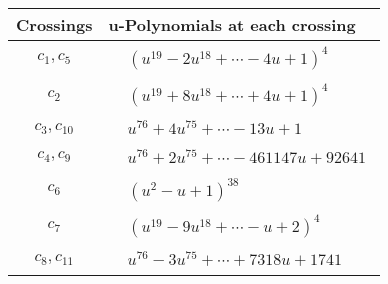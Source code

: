 \documentclass[1p]{elsarticle_modified}
\theoremstyle{definition}
\begin{document}
\begin{tabular}{m{50pt}|m{274pt}}
Crossings & \hspace{64pt}u-Polynomials at each crossing \\
\hline $$\begin{aligned}c_{1},c_{5}\end{aligned}$$&$\begin{aligned}
&(u^{19}-2 u^{18}+\cdots-4 u+1)^{4}
\end{aligned}$\\
\hline $$\begin{aligned}c_{2}\end{aligned}$$&$\begin{aligned}
&(u^{19}+8 u^{18}+\cdots+4 u+1)^{4}
\end{aligned}$\\
\hline $$\begin{aligned}c_{3},c_{10}\end{aligned}$$&$\begin{aligned}
&u^{76}+4 u^{75}+\cdots-13 u+1
\end{aligned}$\\
\hline $$\begin{aligned}c_{4},c_{9}\end{aligned}$$&$\begin{aligned}
&u^{76}+2 u^{75}+\cdots-461147 u+92641
\end{aligned}$\\
\hline $$\begin{aligned}c_{6}\end{aligned}$$&$\begin{aligned}
&(u^2- u+1)^{38}
\end{aligned}$\\
\hline $$\begin{aligned}c_{7}\end{aligned}$$&$\begin{aligned}
&(u^{19}-9 u^{18}+\cdots- u+2)^{4}
\end{aligned}$\\
\hline $$\begin{aligned}c_{8},c_{11}\end{aligned}$$&$\begin{aligned}
&u^{76}-3 u^{75}+\cdots+7318 u+1741
\end{aligned}$\\
\hline
\end{tabular}\\~\\
\newpage\renewcommand{\arraystretch}{1}
\end{document}
